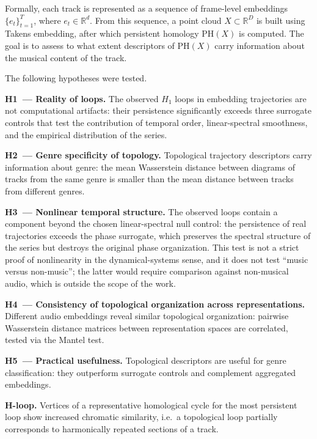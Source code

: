 Formally, each track is represented as a sequence of frame-level embeddings $\{e_t\}_{t=1}^{T}$, where $e_t \in \mathbb{R}^d$. From this sequence, a point cloud $X \subset \mathbb{R}^D$ is built using Takens embedding, after which persistent homology $\mathrm{PH}(X)$ is computed. The goal is to assess to what extent descriptors of $\mathrm{PH}(X)$ carry information about the musical content of the track.

The following hypotheses were tested.

\textbf{H1~--- Reality of loops.} The observed $H_1$ loops in embedding trajectories are not computational artifacts: their persistence significantly exceeds three surrogate controls that test the contribution of temporal order, linear-spectral smoothness, and the empirical distribution of the series.

\textbf{H2~--- Genre specificity of topology.} Topological trajectory descriptors carry information about genre: the mean Wasserstein distance between diagrams of tracks from the same genre is smaller than the mean distance between tracks from different genres.

\textbf{H3~--- Nonlinear temporal structure.} The observed loops contain a component beyond the chosen linear-spectral null control: the persistence of real trajectories exceeds the phase surrogate, which preserves the spectral structure of the series but destroys the original phase organization. This test is not a strict proof of nonlinearity in the dynamical-systems sense, and it does not test ``music versus non-music''; the latter would require comparison against non-musical audio, which is outside the scope of the work.

\textbf{H4~--- Consistency of topological organization across representations.} Different audio embeddings reveal similar topological organization: pairwise Wasserstein distance matrices between representation spaces are correlated, tested via the Mantel test.

\textbf{H5~--- Practical usefulness.} Topological descriptors are useful for genre classification: they outperform surrogate controls and complement aggregated embeddings.

\textbf{H-loop.} Vertices of a representative homological cycle for the most persistent loop show increased chromatic similarity, i.e.\ a topological loop partially corresponds to harmonically repeated sections of a track.
